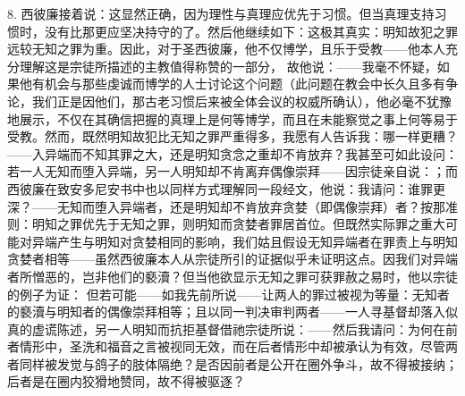 8. 西彼廉接着说：这显然正确，因为理性与真理应优先于习惯。但当真理支持习惯时，没有比那更应坚决持守的了。然后他继续如下：这极其真实：明知故犯之罪远较无知之罪为重。因此，对于圣西彼廉，他不仅博学，且乐于受教——他本人充分理解这是宗徒所描述的主教值得称赞的一部分， 故他说：——我毫不怀疑，如果他有机会与那些虔诚而博学的人士讨论这个问题（此问题在教会中长久且多有争论，我们正是因他们，那古老习惯后来被全体会议的权威所确认），他必毫不犹豫地展示，不仅在其确信把握的真理上是何等博学，而且在未能察觉之事上何等易于受教。然而，既然明知故犯比无知之罪严重得多，我愿有人告诉我：哪一样更糟？——入异端而不知其罪之大，还是明知贪念之重却不肯放弃？我甚至可如此设问：若一人无知而堕入异端，另一人明知却不肯离弃偶像崇拜——因宗徒亲自说：；而西彼廉在致安多尼安书中也以同样方式理解同一段经文，他说：我请问：谁罪更深？——无知而堕入异端者，还是明知却不肯放弃贪婪（即偶像崇拜）者？按那准则：明知之罪优先于无知之罪，则明知而贪婪者罪居首位。但既然实际罪之重大可能对异端产生与明知对贪婪相同的影响，我们姑且假设无知异端者在罪责上与明知贪婪者相等——虽然西彼廉本人从宗徒所引的证据似乎未证明这点。因我们对异端者所憎恶的，岂非他们的褻瀆？但当他欲显示无知之罪可获罪赦之易时，他以宗徒的例子为证： 但若可能——如我先前所说——让两人的罪过被视为等量：无知者的褻瀆与明知者的偶像崇拜相等；且以同一判决审判两者——一人寻基督却落入似真的虚谎陈述，另一人明知而抗拒基督借祂宗徒所说：——然后我请问：为何在前者情形中，圣洗和福音之言被视同无效，而在后者情形中却被承认为有效，尽管两者同样被发觉与鸽子的肢体隔绝？是否因前者是公开在圈外争斗，故不得被接纳；后者是在圈内狡猾地赞同，故不得被驱逐？\par

